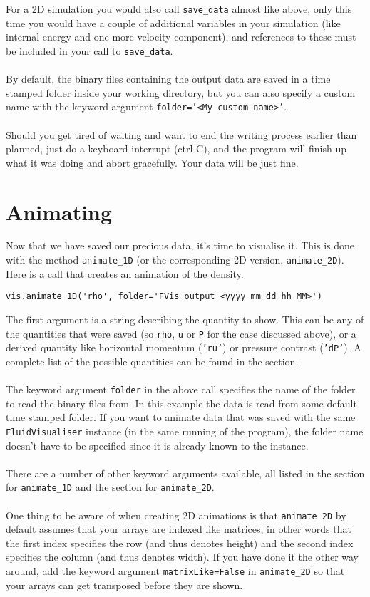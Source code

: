 \documentclass{article}
\newcommand{\ttt}[1]{\texttt{#1}}
\begin{document}
For a 2D simulation you would also call \ttt{save\_data} almost like above, only this time you would have a couple of additional variables in your simulation (like internal energy and one more velocity component), and references to these must be included in your call to \ttt{save\_data}.\\\\
By default, the binary files containing the output data are saved in a time stamped folder inside your working directory, but you can also specify a custom name with the keyword argument \ttt{folder='<My custom name>'}.\\\\
Should you get tired of waiting and want to end the writing process earlier than planned, just do a keyboard interrupt (ctrl-C), and the program will finish up what it was doing and abort gracefully. Your data will be just fine.

\section{Animating}
\label{sec:anim}
Now that we have saved our precious data, it's time to visualise it. This is done with the method \ttt{animate\_1D} (or the corresponding 2D version, \ttt{animate\_2D}). Here is a call that creates an animation of the density.
\begin{lstlisting}
vis.animate_1D('rho', folder='FVis_output_<yyyy_mm_dd_hh_MM>')
\end{lstlisting}
The first argument is a string describing the quantity to show. This can be any of the quantities that were saved (so \ttt{rho}, \ttt{u} or \ttt{P} for the case discussed above), or a derived quantity like horizontal momentum (\ttt{'ru'}) or pressure contrast (\ttt{'dP'}). A complete list of the possible quantities can be found in the  section.\\\\
The keyword argument \ttt{folder} in the above call specifies the name of the folder to read the binary files from. In this example the data is read from some default time stamped folder. If you want to animate data that was saved with the same \ttt{FluidVisualiser} instance (in the same running of the program), the folder name doesn't have to be specified since it is already known to the instance.\\\\
There are a number of other keyword arguments available, all listed in the  section for \ttt{animate\_1D} and the  section for \ttt{animate\_2D}.\\\\
One thing to be aware of when creating 2D animations is that \ttt{animate\_2D} by default assumes that your arrays are indexed like matrices, in other words that the first index specifies the row (and thus denotes height) and the second index specifies the column (and thus denotes width). If you have done it the other way around, add the keyword argument \ttt{matrixLike=False} in \ttt{animate\_2D} so that your arrays can get transposed before they are shown.
\end{document}
